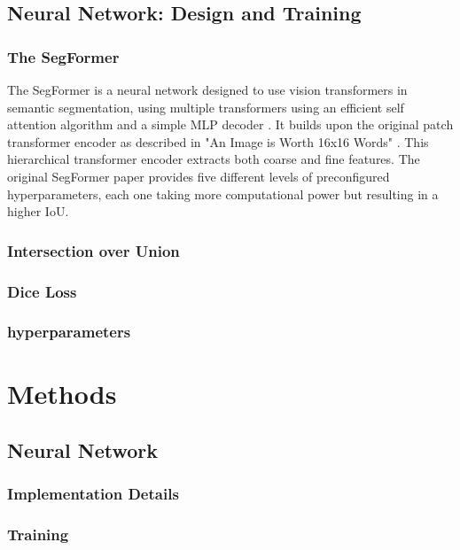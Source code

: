 \documentclass[12pt]{article}
\begin{document}
    \subsection*{Neural Network: Design and Training}

    \subsubsection*{The SegFormer}

    The SegFormer is a neural network designed to use vision transformers in semantic segmentation, using multiple transformers using an efficient self attention algorithm and a simple MLP decoder \cite{DBLP:journals/corr/abs-2105-15203}. It builds upon the original patch transformer encoder as described in "An Image is Worth 16x16 Words" \cite{DBLP:journals/corr/abs-2010-11929}. This hierarchical transformer encoder extracts both coarse and fine features. The original SegFormer paper provides five different levels of preconfigured hyperparameters, each one taking more computational power but resulting in a higher IoU.

    \subsubsection*{Intersection over Union}

    \subsubsection*{Dice Loss}

    \subsubsection*{hyperparameters}

    \section{Methods}

    \subsection*{Neural Network}

    \subsubsection*{Implementation Details}

    \subsubsection*{Training}
\end{document}
